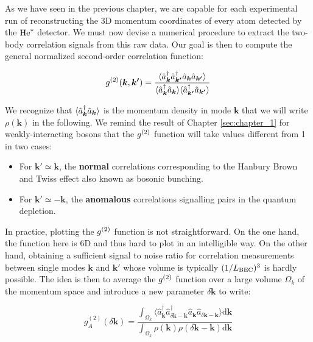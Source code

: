 As we have seen in the previous chapter, we are capable for each experimental run of reconstructing the 3D momentum coordinates of every atom detected by the $\mathrm{He}^*$ detector. We must now devise a numerical procedure to extract the two-body correlation signals from this raw data. Our goal is then to compute the general normalized second-order correlation function:

\begin{equation}
    g^{(2)} (\bm{k},\bm{k'}) = \frac{\langle\hat{a}^{\dagger}_{\bm{k}} \hat{a}^{\dagger}_{\bm{k'}} \hat{a}_{\bm{k}} \hat{a}_{\bm{k'}}\rangle}{\langle\hat{a}^{\dagger}_{\bm{k}} \hat{a}_{\bm{k}}\rangle \langle\hat{a}^{\dagger}_{\bm{k'}} \hat{a}_{\bm{k'}} \rangle}
\end{equation}

\noindent We recognize that $\langle\hat{a}^{\dagger}_{\bm{k}} \hat{a}_{\bm{k}}\rangle$ is the momentum density in mode $\bm{k}$ that we will write $\rho(\bm{k})$ in the following. We remind the result of Chapter \ref{sec:chapter_1} for weakly-interacting bosons that the $g^{(2)}$ function will take values different from 1 in two cases:

\begin{itemize}
    \item For $\bm{k'} \simeq \bm{k}$, the \textbf{normal} correlations corresponding to the Hanbury Brown and Twiss effect also known as bosonic bunching.
    \item For $\bm{k'} \simeq -\bm{k}$, the \textbf{anomalous} correlations signalling \kmk pairs in the quantum depletion.
\end{itemize}

In practice, plotting the $g^{(2)}$ function is not straightforward. On the one hand, the function here is 6D and thus hard to plot in an intelligible way. On the other hand, obtaining a sufficient signal to noise ratio for correlation measurements between single modes $\bm{k}$ and $\bm{k'}$ whose volume is typically $(1/L_{\rm{BEC}})^3$ is hardly possible. The idea is then to average the $g^{(2)}$ function over a large volume $\Omega_k$ of the momentum space and introduce a new parameter $\delta \bm{k}$ to write:

\begin{equation}
    g_{A}^{(2)} (\delta {\bm k})=\frac{\int_{\Omega_{k}} \langle \hat{a}^{\dagger}_{\bm k} \hat{a}^{\dagger}_{\delta {\bm k} - {\bm k}} \hat{a}_{\bm k} \hat{a}_{\delta {\bm k} - {\bm k}} \rangle \mathrm{d}{\bm k}}{\int_{\Omega_{k}} \rho(\bm k) \rho(\delta {\bm k} - {\bm k}) \mathrm{d}\bm{k}}
    \label{Eq:g2_anomalous}
\end{equation}

